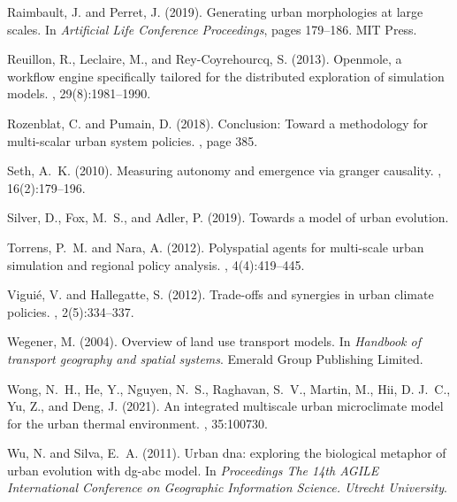 \documentclass[letterpaper]{article}
\begin{document}
\begin{thebibliography}{}
Raimbault, J. and Perret, J. (2019).
\newblock Generating urban morphologies at large scales.
\newblock In {\em Artificial Life Conference Proceedings}, pages 179--186. MIT
  Press.

Reuillon, R., Leclaire, M., and Rey-Coyrehourcq, S. (2013).
\newblock Openmole, a workflow engine specifically tailored for the distributed
  exploration of simulation models.
, 29(8):1981--1990.

Rozenblat, C. and Pumain, D. (2018).
\newblock Conclusion: Toward a methodology for multi-scalar urban system
  policies.
,
  page 385.

Seth, A.~K. (2010).
\newblock Measuring autonomy and emergence via granger causality.
, 16(2):179--196.

Silver, D., Fox, M.~S., and Adler, P. (2019).
\newblock Towards a model of urban evolution.

Torrens, P.~M. and Nara, A. (2012).
\newblock Polyspatial agents for multi-scale urban simulation and regional
  policy analysis.
, 4(4):419--445.

Vigui{\'e}, V. and Hallegatte, S. (2012).
\newblock Trade-offs and synergies in urban climate policies.
, 2(5):334--337.

Wegener, M. (2004).
\newblock Overview of land use transport models.
\newblock In {\em Handbook of transport geography and spatial systems}. Emerald
  Group Publishing Limited.

Wong, N.~H., He, Y., Nguyen, N.~S., Raghavan, S.~V., Martin, M., Hii, D. J.~C.,
  Yu, Z., and Deng, J. (2021).
\newblock An integrated multiscale urban microclimate model for the urban
  thermal environment.
, 35:100730.

Wu, N. and Silva, E.~A. (2011).
\newblock Urban dna: exploring the biological metaphor of urban evolution with
  dg-abc model.
\newblock In {\em Proceedings The 14th AGILE International Conference on
  Geographic Information Science. Utrecht University}.


\end{thebibliography}
\end{document}
